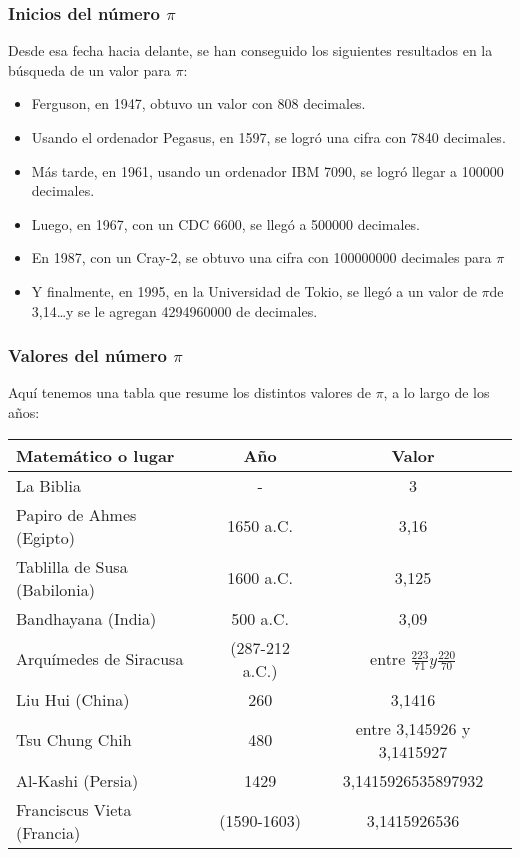 \documentclass{beamer}
\newcommand{\PI}{{$\pi$}}
\begin{document}
\begin{frame}
\frametitle{Inicios del número \PI}
Desde esa fecha hacia delante, se han conseguido los siguientes resultados en la búsqueda de un valor para \PI:

\begin{itemize}
\item Ferguson, en 1947, obtuvo un valor con 808 decimales.
\item Usando el ordenador Pegasus, en 1597, se logró una cifra con 7840 decimales.
\item Más tarde, en 1961, usando un ordenador IBM 7090, se logró llegar a 100000 decimales.
\item Luego, en 1967, con un CDC 6600, se llegó a 500000 decimales. 
\item En 1987, con un Cray-2, se obtuvo una cifra con 100000000 decimales para \PI
\item Y finalmente, en 1995, en la Universidad de Tokio, se llegó a un valor de \PI de 3,14\dots y se le agregan 4294960000 de decimales.
\end{itemize}

\end{frame}

\begin{frame}
\frametitle{Valores del número \PI}
Aquí tenemos una tabla que resume los distintos valores de \PI, a lo largo de los años:

\begin{tabular}{lcc}
Matemático o lugar & Año & Valor\\
\hline
La Biblia & - & 3\\
Papiro de Ahmes (Egipto) & 1650 a.C. & 3,16 \\
Tablilla de Susa (Babilonia) & 1600 a.C. & 3,125 \\
Bandhayana (India) & 500 a.C. & 3,09\\
Arquímedes de Siracusa & (287-212 a.C.) & entre $\frac{223}{71} y \frac{220}{70}$\\
Liu Hui (China) & 260 & 3,1416\\
Tsu Chung Chih & 480 & entre 3,145926 y 3,1415927\\
Al-Kashi (Persia) & 1429 & 3,1415926535897932\\
Franciscus Vieta (Francia) & (1590-1603) & 3,1415926536
\end{tabular}

\end{frame}
\end{document}
